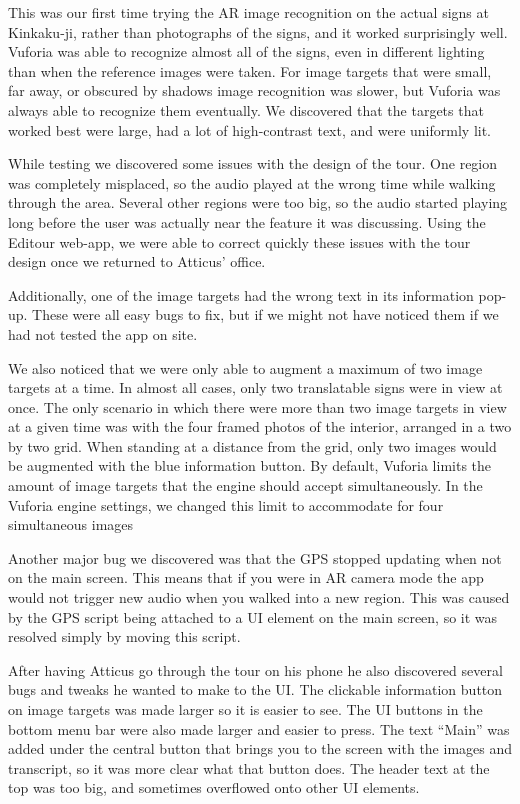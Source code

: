 \documentclass[a4paper, 10pt, american, titlepage]{article}
\begin{document}
This was our first time trying the AR image recognition on the actual signs at
Kinkaku-ji, rather than photographs of the signs, and it worked surprisingly
well. Vuforia was able to recognize almost all of the signs, even in different
lighting than when the reference images were taken. For image targets that were
small, far away, or obscured by shadows image recognition was slower, but
Vuforia was always able to recognize them eventually. We discovered that the
targets that worked best were large, had a lot of high-contrast text, and were
uniformly lit.

While testing we discovered some issues with the design of the tour. One
region was completely misplaced, so the audio played at the wrong time while
walking through the area. Several other regions were too big, so the audio
started playing long before the user was actually near the feature it was
discussing. Using the Editour web-app, we were able to correct quickly these
issues with the tour design once we returned to Atticus' office.

Additionally, one of the image targets had the wrong text in its information
pop-up. These were all easy bugs to fix, but if we might not have noticed
them if we had not tested the app on site.

We also noticed that we were only able to augment a maximum of two
image targets at a time. In almost all cases, only two translatable signs
were in view at once. The only scenario in which there were more than two
image targets in view at a given time was with the four framed photos of the
interior, arranged in a two by two grid. When standing at a distance from the
grid, only two images would be augmented with the blue information button. By
default, Vuforia limits the amount of image targets that the engine should
accept simultaneously. In the Vuforia engine settings, we changed this limit
to accommodate for four simultaneous images

Another major bug we discovered was that the GPS stopped updating when not on
the main screen. This means that if you were in AR camera mode the app would not
trigger new audio when you walked into a new region. This was caused by the GPS
script being attached to a UI element on the main screen, so it was resolved
simply by moving this script.

After having Atticus go through the tour on his phone he also discovered several
bugs and tweaks he wanted to make to the UI. The clickable information button on
image targets was made larger so it is easier to see. The UI buttons in the
bottom menu bar were also made larger and easier to press. The text ``Main'' was
added under the central button that brings you to the screen with the images and
transcript, so it was more clear what that button does. The header text at the
top was too big, and sometimes overflowed onto other UI elements.
\end{document}
